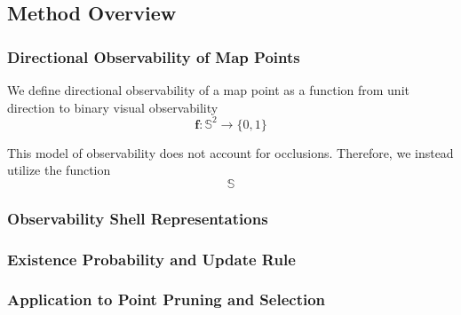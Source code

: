 \subsection{Method Overview}

\subsubsection{Directional Observability of Map Points}


We define directional observability of a map point as a function from unit direction to binary visual observability
$$
    \boldsymbol{f}:\mathbb{S}^2\rightarrow\{0,1\}
$$


This model of observability does not account for occlusions. Therefore, we instead utilize the function
$$
    \mathbb{S}
$$



\subsubsection{Observability Shell Representations}

\subsubsection{Existence Probability and Update Rule}

\subsubsection{Application to Point Pruning and Selection}
